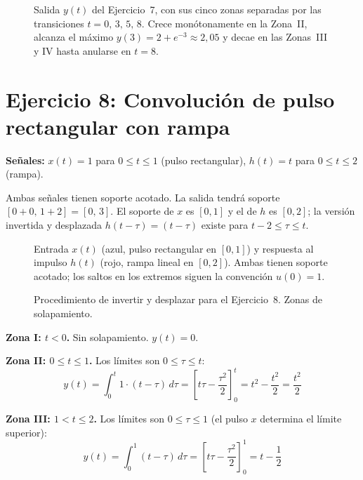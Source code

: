 \documentclass[10pt,a4paper]{article}
\begin{document}
	\begin{figure}[H]
	\centering
	
	\caption{Salida $y(t)$ del Ejercicio~7, con sus cinco zonas separadas por las transiciones $t=0,\,3,\,5,\,8$. Crece monótonamente en la Zona~II, alcanza el máximo $y(3) = 2 + e^{-3} \approx 2{,}05$ y decae en las Zonas~III y IV hasta anularse en $t = 8$.}
	\end{figure}

	\section*{Ejercicio 8: Convolución de pulso rectangular con rampa}
	
	\textbf{Señales:} $x(t) = 1$ para $0 \leq t \leq 1$ (pulso rectangular), $h(t) = t$ para $0 \leq t \leq 2$ (rampa).
	
	Ambas señales tienen soporte acotado. La salida tendrá soporte $[0+0,\, 1+2] = [0,\, 3]$. El soporte de $x$ es $[0,1]$ y el de $h$ es $[0,2]$; la versión invertida y desplazada $h(t-\tau) = (t-\tau)$ existe para $t-2 \leq \tau \leq t$.

	\begin{figure}[H]
	\centering
	
	\caption{Entrada $x(t)$ (azul, pulso rectangular en $[0,1]$) y respuesta al impulso $h(t)$ (rojo, rampa lineal en $[0,2]$). Ambas tienen soporte acotado; los saltos en los extremos siguen la convención $u(0)=1$.}
	\end{figure}

	\begin{figure}[H]
	\centering
	
	\caption{Procedimiento de invertir y desplazar para el Ejercicio~8. Zonas de solapamiento.}
	\end{figure}
	
	\textbf{Zona I: $t < 0$.} Sin solapamiento. $y(t) = 0$.
	
	\textbf{Zona II: $0 \leq t \leq 1$.} Los límites son $0 \leq \tau \leq t$:
	\[
	y(t) = \int_0^t 1\cdot(t-\tau)\,d\tau = \left[t\tau - \frac{\tau^2}{2}\right]_0^t = t^2 - \frac{t^2}{2} = \frac{t^2}{2}
	\]
	
	\textbf{Zona III: $1 < t \leq 2$.} Los límites son $0 \leq \tau \leq 1$ (el pulso $x$ determina el límite superior):
	\[
	y(t) = \int_0^1 (t-\tau)\,d\tau = \left[t\tau - \frac{\tau^2}{2}\right]_0^1 = t - \frac{1}{2}
	\]
	
\end{document}
